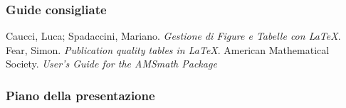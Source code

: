 \begin{frame}
  \frametitle{Guide consigliate}
	\begin{thebibliography}{Fer66}
			Caucci, Luca; Spadaccini, Mariano.
			\newblock\textit{Gestione di Figure e Tabelle con \LaTeX}.
			Fear, Simon.
			\newblock\textit{Publication quality tables in \LaTeX}.
			American Mathematical Society.
			\newblock\textit{User's Guide for the AMSmath Package}
	\end{thebibliography}
\end{frame}
\begin{frame}
  \frametitle{Piano della presentazione}
  \tableofcontents
\end{frame}
